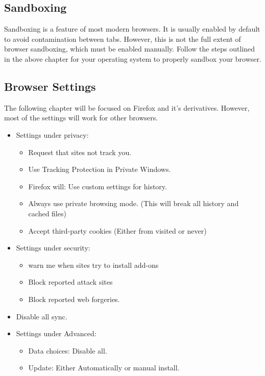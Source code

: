 \documentclass[a4paper,11pt]{report}
\begin{document}
		\subsection{Sandboxing}
			Sandboxing is a feature of most modern browsers. It is usually enabled by default to avoid contamination between tabs. 
			However, this is not the full extent of browser sandboxing, which must be enabled manually. 
			Follow the steps outlined in the above chapter for your operating system to properly sandbox your browser. 
		\subsection{Browser Settings}
			The following chapter will be focused on Firefox and it's derivatives. 
			However, most of the settings will work for other browsers. 
			\begin{itemize}
				\item Settings under privacy:
					\begin{itemize}
						\item Request that sites not track you. 
						\item Use Tracking Protection in Private Windows. 
						\item Firefox will: Use custom settings for history. 
						\item Always use private browsing mode. (This will break all history and cached files) 
						\item Accept third-party cookies (Either from visited or never)
					\end{itemize}
				\item Settings under security:
					\begin{itemize}
						\item warn me when sites try to install add-ons
						\item Block reported attack sites
						\item Block reported web forgeries. 
					\end{itemize}
				\item Disable all sync. 
				\item Settings under Advanced:
					\begin{itemize}
						\item Data choices: Disable all.
						\item Update: Either Automatically or manual install. 
					\end{itemize}
			\end{itemize}
\end{document}
